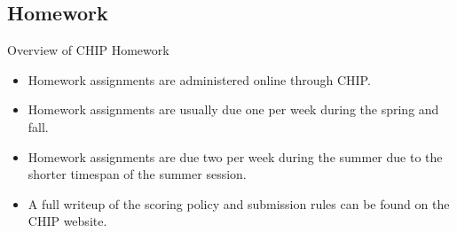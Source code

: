 \documentclass{beamer}
\begin{document}
\subsection*{Homework}

\begin{frame}{Overview of CHIP Homework}
  \begin{itemize}
    \item Homework assignments are administered online through CHIP.
    \item Homework assignments are usually due one per week during the spring and fall.
    \item Homework assignments are due two per week during the summer due to the shorter timespan of the summer session.
    \item A full writeup of the scoring policy and submission rules can be found on the CHIP website.
  \end{itemize}
\end{frame}
\end{document}
